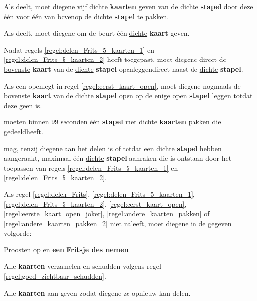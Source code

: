 \vervolgLijst{}
\item Als \Frits deelt\footnotemark[1], moet diegene \alleSpelers vijf \ul{dichte} \textbf{kaarten} geven van de \ul{dichte} \textbf{stapel} door deze één voor één van bovenop de \ul{dichte} \textbf{stapel} te pakken.
\label{regel:delen_Frits_5_kaarten_1}
\eindLijst{}

\vervolgLijst{}
\item Als \Frits deelt\footnotemark[1], moet diegene \alleSpelers om de beurt één \ul{dichte} \textbf{kaart} geven.
\label{regel:delen_Frits_5_kaarten_2}
\eindLijst{}

\vervolgLijst{}
\item Nadat \Frits regels \ref{regel:delen_Frits_5_kaarten_1} en \ref{regel:delen_Frits_5_kaarten_2} heeft toegepast, moet diegene direct de \ul{bovenste} \textbf{kaart} van de \ul{dichte} \textbf{stapel} openleggen\footnotemark[2] direct naast de \ul{dichte} \textbf{stapel}.
\label{regel:eerst_kaart_open}
\eindLijst{}

\vervolgLijst{}
\item Als \Frits een \footnotemark[3] openlegt in regel \ref{regel:eerst_kaart_open}, moet diegene nogmaals de \ul{bovenste} \textbf{kaart} van de \ul{dichte} \textbf{stapel} \ul{open} op de enige \ul{open} \textbf{stapel} leggen totdat deze geen \footnotemark[3] is.
\label{regel:eerste_kaart_open_joker}
\eindLijst{}

\vervolgLijst{}
\item \AlleSpelers moeten binnen 99 seconden \'e\'en \textbf{stapel} met \ul{dichte} \textbf{kaarten} pakken die \Frits gedeeld\footnotemark[1] heeft.
\label{regel:andere_kaarten_pakken}
\eindLijst{}

\vervolgLijst{}
\item \EenSpeler mag, tenzij diegene aan het delen is of totdat \alleSpelers een \ul{dichte} \textbf{stapel} hebben aangeraakt, maximaal \'e\'en \ul{dichte} \textbf{stapel} aanraken die is ontstaan door het toepassen van regels \ref{regel:delen_Frits_5_kaarten_1} en \ref{regel:delen_Frits_5_kaarten_2}.
\label{regel:andere_kaarten_pakken_2}
\eindLijst{}

\vervolgLijst{}
\item Als \eenSpeler regel \ref{regel:delen_Frits}, \ref{regel:delen_Frits_5_kaarten_1}, \ref{regel:delen_Frits_5_kaarten_2}, \ref{regel:eerst_kaart_open}, \ref{regel:eerste_kaart_open_joker}, \ref{regel:andere_kaarten_pakken} of \ref{regel:andere_kaarten_pakken_2} niet naleeft, moet diegene in de gegeven volgorde:
\puntLijst{}
\item Proosten op  en \textbf{een Fritsje des nemen}\footnotemark[4].
\item Alle \textbf{kaarten} verzamelen en schudden volgens regel \ref{regel:goed_zichtbaar_schudden}.
\item Alle \textbf{kaarten} aan \Frits geven zodat diegene ze opnieuw kan delen.
\eindPuntLijst{}
\eindLijst{}

